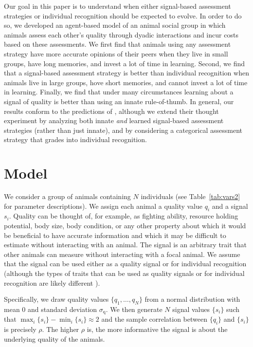 Our goal in this paper is to understand when either signal-based assessment strategies or individual recognition should be expected to evolve.  In order to do so, we developed an agent-based model of an animal social group in which animals assess each other's quality through dyadic interactions and incur costs based on these assessments. We first find that animals using any assessment strategy have more accurate opinions of their peers when they live in small groups, have long memories, and invest a lot of time in learning. Second, we find that a signal-based assessment strategy is better than individual recognition when animals live in large groups, hove short memories, and cannot invest a lot of time in learning. Finally, we find that under many circumstances learning about a signal of quality is better than using an innate rule-of-thumb. In general, our results conform to the predictions of \citet{sheehan2016evotradeoff}, although we extend their thought experiment by analyzing both innate \emph{and} learned signal-based assessment strategies (rather than just innate), and by considering a categorical assessment strategy that grades into individual recognition. 
 

\section*{Model } 

We consider a group of animals containing $N$ individuals (see Table~\ref{tab:vars2} for parameter descriptions). We assign each animal a quality value $q_i$ and a signal $s_i$. Quality can be thought of, for example, as fighting ability, resource holding potential, body size, body condition, or any other property about which it would be beneficial to have accurate information and which it may be difficult to estimate without interacting with an animal. The signal is an arbitrary trait that other animals can measure without interacting with a focal animal.  We assume that the signal can be used either as a quality signal or for individual recognition (although the types of traits that can be used  as quality signals or for individual recognition are likely different \citep{Dale:2001dv}).

Specifically, we draw quality values $\{q_1,\dots,q_N\}$ from a normal distribution with mean $0$ and standard deviation $\sigma_\text{q}$. We then generate $N$ signal values $\{s_i\}$ such that 
$\max_i\{s_i\}-\min_i\{s_i\}\approx 2$ and the sample correlation between $\{q_i\}$ and $\{s_i\}$ is precisely $\rho$. 
The higher $\rho$ is, the more informative the signal is about the underlying quality of the animals. 

